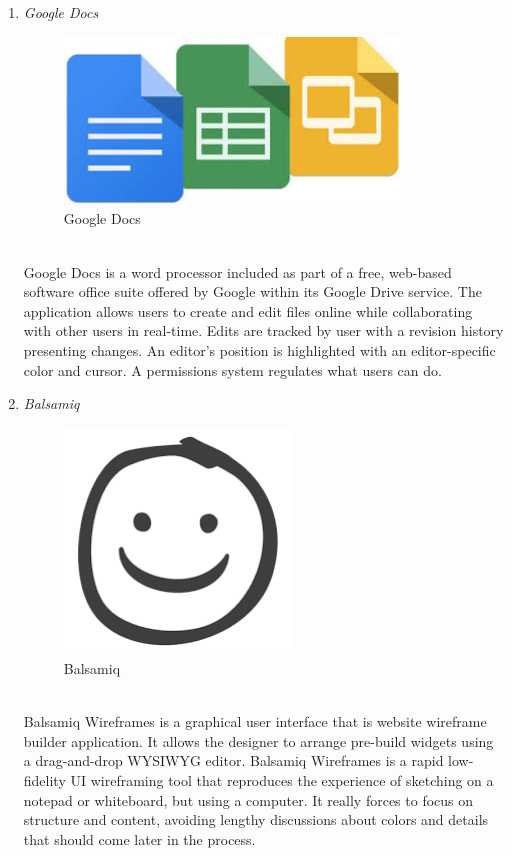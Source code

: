 \documentclass[conference]{IEEEtran}
\begin{document}
\begin{enumerate}
   \item \textit{Google Docs }
                   \begin{figure}[htbp]
    \centerline{\includegraphics[width=89mm, scale=0.5]{fig/google.jpg}}
    \caption{Google Docs}
    \label{fig}
    \end{figure}
   \\Google Docs is a word processor included as part of a free, web-based software office suite offered by Google within its Google Drive service. The application allows users to create and edit files online while collaborating with other users in real-time. Edits are tracked by user with a revision history presenting changes. An editor's position is highlighted with an editor-specific color and cursor. A permissions system regulates what users can do.\\
   \item \textit{Balsamiq }
                   \begin{figure}[htbp]
    \centerline{\includegraphics[width=60mm, scale=0.5]{fig/balsamiq.png}}
    \caption{Balsamiq }
    \label{fig}
    \end{figure}
   \\Balsamiq Wireframes is a graphical user interface that is website wireframe builder application. It allows the designer to arrange pre-build widgets using a drag-and-drop WYSIWYG editor. Balsamiq Wireframes is a rapid low-fidelity UI wireframing tool that reproduces the experience of sketching on a notepad or whiteboard, but using a computer. It really forces to focus on structure and content, avoiding lengthy discussions about colors and details that should come later in the process.\\

\end{enumerate}
\end{document}
